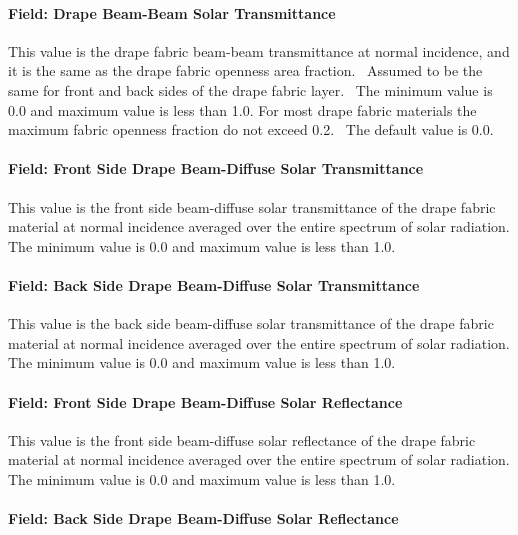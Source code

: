 \paragraph{Field: Drape Beam-Beam Solar Transmittance}\label{field-drape-beam-beam-solar-transmittance}

This value is the drape fabric beam-beam transmittance at normal incidence, and it is the same as the drape fabric openness area fraction.~ Assumed to be the same for front and back sides of the drape fabric layer.~ The minimum value is 0.0 and maximum value is less than 1.0. For most drape fabric materials the maximum fabric openness fraction do not exceed 0.2.~ The default value is 0.0.

\paragraph{Field: Front Side Drape Beam-Diffuse Solar Transmittance}\label{field-front-side-drape-beam-diffuse-solar-transmittance}

This value is the front side beam-diffuse solar transmittance of the drape fabric material at normal incidence averaged over the entire spectrum of solar radiation. The minimum value is 0.0 and maximum value is less than 1.0.

\paragraph{Field: Back Side Drape Beam-Diffuse Solar Transmittance}\label{field-back-side-drape-beam-diffuse-solar-transmittance}

This value is the back side beam-diffuse solar transmittance of the drape fabric material at normal incidence averaged over the entire spectrum of solar radiation. The minimum value is 0.0 and maximum value is less than 1.0.

\paragraph{Field: Front Side Drape Beam-Diffuse Solar Reflectance}\label{field-front-side-drape-beam-diffuse-solar-reflectance}

This value is the front side beam-diffuse solar reflectance of the drape fabric material at normal incidence averaged over the entire spectrum of solar radiation. The minimum value is 0.0 and maximum value is less than 1.0.

\paragraph{Field: Back Side Drape Beam-Diffuse Solar Reflectance}\label{field-back-side-drape-beam-diffuse-solar-reflectance}

